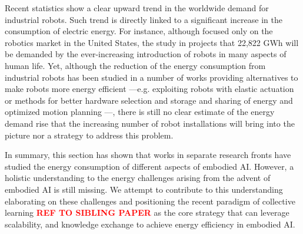 Recent statistics \cite{IFR2019} show a clear upward trend in the worldwide demand for industrial robots. Such trend is directly linked to a significant increase in the consumption of electric energy. For instance, although focused only on the robotics market in the United States, the study in \cite{barnett_2017} projects that 22,822 GWh will be demanded by the ever-increasing introduction of robots in many aspects of human life. Yet, although the reduction of the energy consumption from industrial robots has been studied in a number of works \cite{schroder2014, chalmers2015, mohammed2014, chemnitz2011} providing alternatives to make robots more energy efficient ---e.g. exploiting robots with elastic actuation \cite{scalera2019natural, carabin2017review, bolivar2017general, haddadin2011optimal,haddadin2012intrinsically} or methods for better hardware selection and storage and sharing of energy and optimized motion planning \cite{carabin2017review}---,  there is still no clear estimate of the energy demand rise that the increasing number of robot installations will bring into the picture nor a strategy to address this problem.



In summary, this section has shown that works in separate research fronts have studied the energy consumption of different aspects of embodied AI. However, a holistic understanding to the energy challenges arising from the advent of embodied AI is still missing. We attempt to contribute to this understanding elaborating on these challenges and positioning the recent paradigm of collective learning \textbf{\textcolor{red}{REF TO SIBLING PAPER}} as the core strategy that can leverage scalability, and knowledge exchange to achieve energy efficiency in embodied AI.